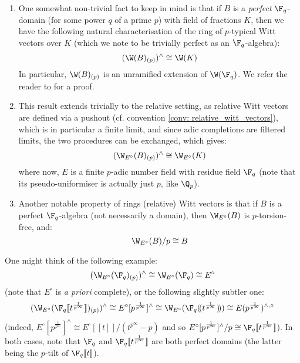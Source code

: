             \begin{remark} \label{remark: witt_vectors_over_perfect_rings}
                \noindent
                \begin{enumerate}
                    \item One somewhat non-trivial fact to keep in mind is that if $B$ is a \textit{perfect} $\F_q$-domain (for some power $q$ of a prime $p$) with field of fractions $K$, then we have the following natural characterisation of the ring of $p$-typical Witt vectors over $K$ (which we note to be trivially perfect as an $\F_q$-algebra):
                    $$(\W(B)_{(p)})^{\wedge} \cong \W(K)$$
                    In particular, $\W(B)_{(p)}$ is an unramified extension of $\W(\F_q)$. We refer the reader to \cite[Proposition 5.2]{shimomoto2014witt} for a proof.
                    \item This result extends trivially to the relative setting, as relative Witt vectors are defined via a pushout (cf. convention \ref{conv: relative_witt_vectors}), which is in particular a finite limit, and since adic completions are filtered limits, the two procedures can be exchanged, which gives:
                        $$(\W_{E^{\circ}}(B)_{(p)})^{\wedge} \cong \W_{E^{\circ}}(K)$$
                    where now, $E$ is a finite $p$-adic number field with residue field $\F_q$ (note that its pseudo-uniformiser is actually just $p$, like $\Q_p$).
                    \item Another notable property of rings (relative) Witt vectors is that if $B$ is a perfect $\F_q$-algebra (not necessarily a domain), then $\W_{E^{\circ}}(B)$ is $p$-torsion-free, and:
                        $$\W_{E^{\circ}}(B)/p \cong B$$
                \end{enumerate}
            \end{remark}
            \begin{example}
                One might think of the following example:
                    $$(\W_{E^{\circ}}(\F_q)_{(p)})^{\wedge} \cong \W_{E^{\circ}}(\F_q) \cong E^{\circ}$$
                (note that $E^{\circ}$ is \textit{a priori} complete), or the following slightly subtler one:
                    $$( \W_{E^{\circ}}( \F_q[\![t^{\frac{1}{p^{\infty}}}]\!] )_{(p)} )^{\wedge} \cong E^{\circ}[p^{\frac{1}{p^{\infty}}}]^{\wedge} \cong \W_{E^{\circ}}( \F_q(\!(t^{\frac{1}{p^{\infty}}})\!) ) \cong E(p^{\frac{1}{p^{\infty}}})^{\wedge, \circ}$$
                (indeed, $E^{\circ}[p^{\frac{1}{p^{\infty}}}]^{\wedge} \cong E^{\circ}[\![t]\!]/(t^{p^{\infty}} - p)$ and so $E^{\circ}[p^{\frac{1}{p^{\infty}}}]^{\wedge}/p \cong \F_q[\![t^{\frac{1}{p^{\infty}}}]\!]$). In both cases, note that $\F_q$ and $\F_q[\![t^{\frac{1}{p^{\infty}}}]\!]$ are both perfect domains (the latter being the $p$-tilt of $\F_q[\![t]\!]$).
            \end{example}
